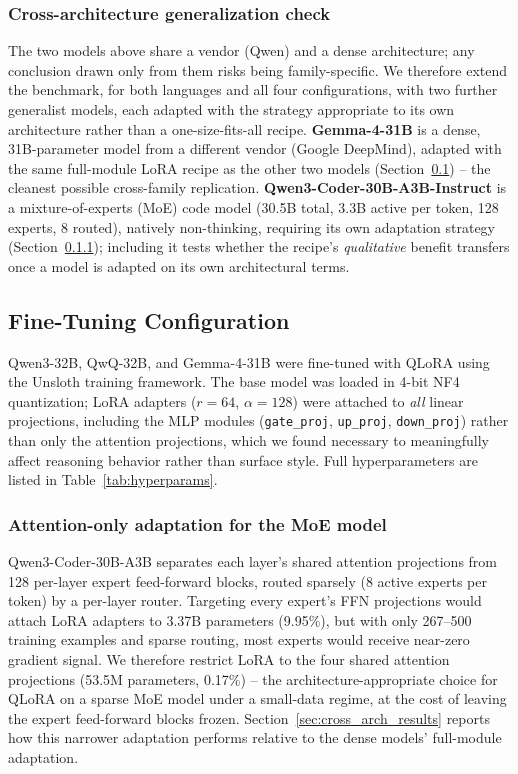 \documentclass[lettersize,journal]{IEEEtran}
\begin{document}
\subsubsection{Cross-architecture generalization check}
\label{sec:cross_arch_selection}
The two models above share a vendor (Qwen) and a dense architecture; any conclusion drawn only from
them risks being family-specific. We therefore extend the benchmark, for both languages and all four
configurations, with two further generalist models, each adapted with the strategy appropriate to
its own architecture rather than a one-size-fits-all recipe. \textbf{Gemma-4-31B}
\cite{gemma_tech_report} is a dense, 31B-parameter model from a different vendor (Google DeepMind),
adapted with the same full-module LoRA recipe as the other two models
(Section~\ref{sec:finetuning_setup}) -- the cleanest possible cross-family replication.
\textbf{Qwen3-Coder-30B-A3B-Instruct} \cite{qwen3coder_2025} is a mixture-of-experts (MoE) code
model (30.5B total, 3.3B active per token, 128 experts, 8 routed), natively non-thinking, requiring
its own adaptation strategy (Section~\ref{sec:moe_lora}); including it tests whether the recipe's
\emph{qualitative} benefit transfers once a model is adapted on its own architectural terms.

\subsection{Fine-Tuning Configuration}
\label{sec:finetuning_setup}

Qwen3-32B, QwQ-32B, and Gemma-4-31B were fine-tuned with QLoRA \cite{dettmers2023qlora,hu2021lora}
using the Unsloth training framework. The base model was loaded in 4-bit NF4 quantization; LoRA
adapters ($r=64$, $\alpha=128$) were attached to \emph{all} linear projections, including the MLP
modules (\texttt{gate\_proj}, \texttt{up\_proj}, \texttt{down\_proj}) rather than only the attention
projections, which we found necessary to meaningfully affect reasoning behavior rather than surface
style. Full hyperparameters are listed in Table~\ref{tab:hyperparams}.

\subsubsection{Attention-only adaptation for the MoE model}
\label{sec:moe_lora}
Qwen3-Coder-30B-A3B separates each layer's shared attention projections from 128 per-layer expert
feed-forward blocks, routed sparsely (8 active experts per token) by a per-layer router. Targeting
every expert's FFN projections would attach LoRA adapters to 3.37B parameters (9.95\%), but with
only 267--500 training examples and sparse routing, most experts would receive near-zero gradient
signal. We therefore restrict LoRA to the four shared attention projections (53.5M parameters,
0.17\%) -- the architecture-appropriate choice for QLoRA on a sparse MoE model under a small-data
regime, at the cost of leaving the expert feed-forward blocks frozen.
Section~\ref{sec:cross_arch_results} reports how this narrower adaptation performs relative to the
dense models' full-module adaptation.
\end{document}
